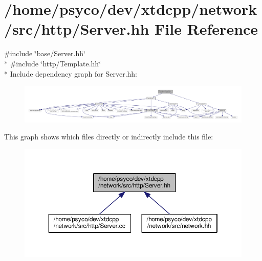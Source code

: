 \hypertarget{http_2Server_8hh}{}\section{/home/psyco/dev/xtdcpp/network/src/http/\+Server.hh File Reference}
\label{http_2Server_8hh}
{\ttfamily \#include \char`\"{}base/\+Server.\+hh\char`\"{}}\\*
{\ttfamily \#include \char`\"{}http/\+Template.\+hh\char`\"{}}\\*
Include dependency graph for Server.\+hh\+:
\nopagebreak
\begin{figure}[H]
\begin{center}
\leavevmode
\includegraphics[width=350pt]{http_2Server_8hh__incl}
\end{center}
\end{figure}
This graph shows which files directly or indirectly include this file\+:
\nopagebreak
\begin{figure}[H]
\begin{center}
\leavevmode
\includegraphics[width=350pt]{http_2Server_8hh__dep__incl}
\end{center}
\end{figure}
